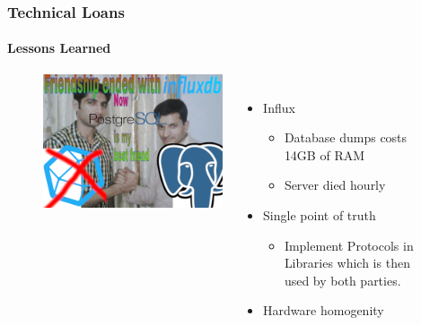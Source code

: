 \begin{frame}
  \frametitle{Technical Loans}
  \framesubtitle{Lessons Learned}

\begin{figure}
\begin{columns}
\begin{center}
\includegraphics[height=0.65\textheight]{figs/meme_postgres_influx.png}
\end{center}
\raggedright
\vspace{0.5cm}

\begin{itemize}
  \item Influx
        \begin{itemize}
          \item Database dumps costs 14GB of RAM
          \item Server died hourly
        \end{itemize}
    \item Single point of truth
    \begin{itemize}
        \item Implement Protocols in Libraries which is then used by both parties.
    \end{itemize}
    \item Hardware homogenity
\end{itemize}
\end{columns}
\end{figure}

\end{frame}

